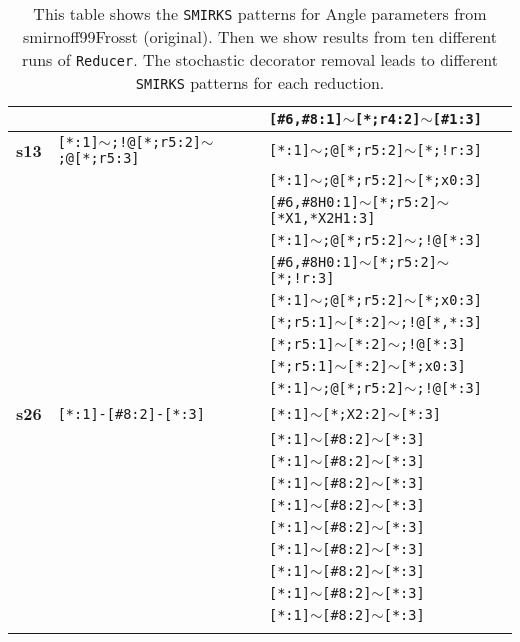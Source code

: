 \begin{longtable}{>{\baselineskip=10pt}p{} >{\baselineskip=10pt}p{} >{\baselineskip=10pt}p{}}
 &  & \texttt{[\#6,\#8:1]$\sim$[*;r4:2]$\sim$[\#1:3]} \\ 
\hline 
\textbf{s13} & \texttt{[*:1]$\sim$;!@[*;r5:2]$\sim$;@[*;r5:3]} & \texttt{[*:1]$\sim$;@[*;r5:2]$\sim$[*;!r:3]} \\ 
 &  & \texttt{[*:1]$\sim$;@[*;r5:2]$\sim$[*;x0:3]} \\ 
 &  & \texttt{[\#6,\#8H0:1]$\sim$[*;r5:2]$\sim$[*X1,*X2H1:3]} \\ 
 &  & \texttt{[*:1]$\sim$;@[*;r5:2]$\sim$;!@[*:3]} \\ 
 &  & \texttt{[\#6,\#8H0:1]$\sim$[*;r5:2]$\sim$[*;!r:3]} \\ 
 &  & \texttt{[*:1]$\sim$;@[*;r5:2]$\sim$[*;x0:3]} \\ 
 &  & \texttt{[*;r5:1]$\sim$[*:2]$\sim$;!@[*,*:3]} \\ 
 &  & \texttt{[*;r5:1]$\sim$[*:2]$\sim$;!@[*:3]} \\ 
 &  & \texttt{[*;r5:1]$\sim$[*:2]$\sim$[*;x0:3]} \\ 
 &  & \texttt{[*:1]$\sim$;@[*;r5:2]$\sim$;!@[*:3]} \\ 
\hline 
\textbf{s26} & \texttt{[*:1]-[\#8:2]-[*:3]} & \texttt{[*:1]$\sim$[*;X2:2]$\sim$[*:3]} \\ 
 &  & \texttt{[*:1]$\sim$[\#8:2]$\sim$[*:3]} \\ 
 &  & \texttt{[*:1]$\sim$[\#8:2]$\sim$[*:3]} \\ 
 &  & \texttt{[*:1]$\sim$[\#8:2]$\sim$[*:3]} \\ 
 &  & \texttt{[*:1]$\sim$[\#8:2]$\sim$[*:3]} \\ 
 &  & \texttt{[*:1]$\sim$[\#8:2]$\sim$[*:3]} \\ 
 &  & \texttt{[*:1]$\sim$[\#8:2]$\sim$[*:3]} \\ 
 &  & \texttt{[*:1]$\sim$[\#8:2]$\sim$[*:3]} \\ 
 &  & \texttt{[*:1]$\sim$[\#8:2]$\sim$[*:3]} \\ 
 &  & \texttt{[*:1]$\sim$[\#8:2]$\sim$[*:3]} \\ 
\hline 
\caption{This table shows the \texttt{SMIRKS} patterns for Angle parameters from smirnoff99Frosst (original). Then we show results from ten different runs of \texttt{Reducer}. The stochastic decorator removal leads to different \texttt{SMIRKS} patterns for each reduction.}
\label{tab:angle_alkethoh}
\end{longtable}


